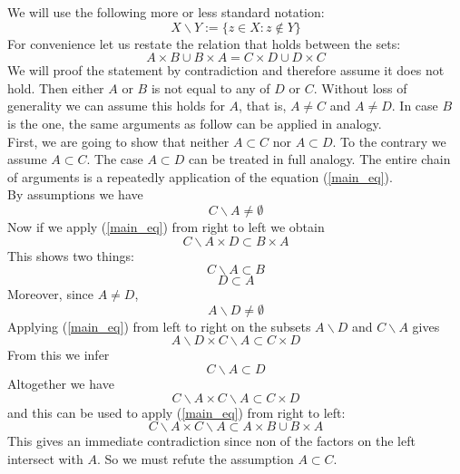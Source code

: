 \documentclass[17pt]{extarticle}
\begin{document}
We will use the following more or less standard notation:
$$X\backslash Y:=\{z\in X : z\notin Y\}$$
For convenience let us restate the relation that holds between the sets:
\begin{equation} \label{main_eq}
	A\times B\cup B\times A=C\times D\cup D\times C
\end{equation}
We will proof the statement by contradiction and therefore assume it does not hold. Then either $A$ or $B$ is not equal to any of $D$ or $C$.
Without loss of generality we can assume this holds for $A$, that is, $A\neq C$ and $A\neq D$.
In case $B$ is the one, the same arguments as follow can be applied in analogy.\\
First, we are going to show that neither $A\subset C$ nor $A\subset D$.
To the contrary we assume $A\subset C$.
The case $A\subset D$ can be treated in full analogy.
The entire chain of arguments is a repeatedly application of the equation (\ref{main_eq}).\\
By assumptions we have
$$C\backslash A\neq\emptyset$$
Now if we apply (\ref{main_eq}) from right to left we obtain
$$C\backslash A\times D\subset B\times A$$
This shows two things:
\begin{equation} \label{CwA_subs_B}
C\backslash A\subset B
\end{equation}
\begin{equation} \label{D_subs_A}
D\subset A
\end{equation}
Moreover, since $A\neq D$,
$$A\backslash D\neq\emptyset$$
Applying (\ref{main_eq}) from left to right on the subsets $A\backslash D$ and $C\backslash A$
gives
$$A\backslash D\times C\backslash A\subset C\times D$$
From this we infer
$$C\backslash A\subset D$$
Altogether we have
$$C\backslash A\times C\backslash A\subset C\times D$$
and this can be used to apply (\ref{main_eq}) from right to left:
$$C\backslash A\times C\backslash A\subset A\times B\cup B\times A$$
This gives an immediate contradiction since non of the factors on the left
intersect with $A$. So we must refute the assumption $A\subset C$.\\
\end{document}
